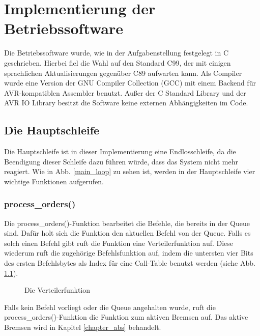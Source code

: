 \chapter{Implementierung der Betriebssoftware}
Die Betriebssoftware wurde, wie in der Aufgabenstellung festgelegt in C geschrieben.
Hierbei fiel die Wahl auf den Standard C99, der mit einigen sprachlichen
Aktualisierungen gegenüber C89 aufwarten kann. Als Compiler wurde eine Version der
GNU Compiler Collection (GCC) mit einem Backend für AVR-kompatiblen Assembler benutzt.
Außer der C Standard Library und der AVR IO Library besitzt die Software keine externen
Abhängigkeiten im Code.

\section{Die Hauptschleife}
Die Hauptschleife ist in dieser Implementierung eine Endlosschleife, da die Beendigung dieser
Schleife dazu führen würde, dass das System nicht mehr reagiert.
Wie in Abb. \ref{main_loop} zu sehen ist, werden in der Hauptschleife vier wichtige Funktionen
aufgerufen.

\subsection{process\_orders()}
Die process\_\-orders()\--Funktion bearbeitet die Befehle, die bereits in der Queue sind. Dafür holt
sich die Funktion den aktuellen Befehl von der Queue. Falls es solch einen Befehl gibt ruft die
Funktion eine Verteilerfunktion auf. Diese wiederum ruft die zugehörige Befehlsfunktion auf, indem
die untersten vier Bits des ersten Befehlsbytes als Index für eine Call-Table benutzt werden (siehe
Abb. \ref{dispatch_function}).\\
\begin{figure}[htb]
 \centering
 \caption{\label{dispatch_function}Die Verteilerfunktion}
\end{figure}
Falls kein Befehl vorliegt oder die Queue angehalten wurde, ruft die process\_\-orders()-Funktion die
Funktion zum aktiven Bremsen auf. Das aktive Bremsen wird in Kapitel \ref{chapter_abs} behandelt.

